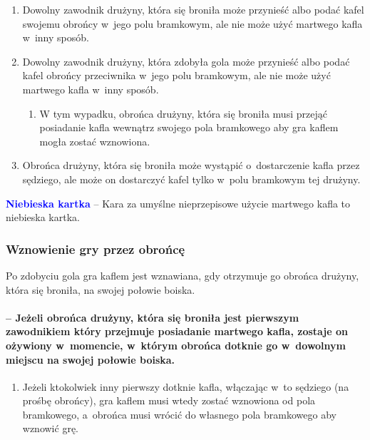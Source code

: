\documentclass[12pt,a4paper]{article}
\newcommand\bluecard[1]{\bgroup\textcolor{blue}{\textbf{#1}}}
\begin{document}
\begin{enumerate}
	\item
	      Dowolny zawodnik drużyny, która się broniła może przynieść albo podać
	      kafel swojemu obrońcy w~jego polu bramkowym, ale nie może użyć
	      martwego kafla w~inny sposób.
	\item
	      Dowolny zawodnik drużyny, która zdobyła gola może przynieść albo podać
	      kafel obrońcy przeciwnika w~jego polu bramkowym, ale nie może użyć
	      martwego kafla w~inny sposób.

	      \begin{enumerate}
		      \item
		            W tym wypadku, obrońca drużyny, która się broniła musi przejąć
		            posiadanie kafla wewnątrz swojego pola bramkowego aby gra kaflem
		            mogła zostać wznowiona.
	      \end{enumerate}
	\item
	      Obrońca drużyny, która się broniła może wystąpić o~dostarczenie kafla
	      przez sędziego, ale może on dostarczyć kafel tylko w~polu bramkowym
	      tej drużyny.
\end{enumerate}

\bluecard{Niebieska kartka} -- Kara za umyślne nieprzepisowe użycie martwego
kafla to niebieska kartka.

\subsubsection{Wznowienie gry przez obrońcę}
Po zdobyciu gola gra
kaflem jest wznawiana, gdy otrzymuje go obrońca drużyny, która się
broniła, na swojej połowie boiska.

\paragraph{ -- Jeżeli obrońca drużyny, która się broniła jest
	pierwszym zawodnikiem który przejmuje posiadanie martwego kafla, zostaje
	on ożywiony w~momencie, w~którym obrońca dotknie go w~dowolnym miejscu
	na swojej połowie boiska.}

\begin{enumerate}
	\item
	      Jeżeli ktokolwiek inny pierwszy dotknie kafla, włączając w~to sędziego
	      (na prośbę obrońcy), gra kaflem musi wtedy zostać wznowiona od pola
	      bramkowego, a~obrońca musi wrócić do własnego pola bramkowego aby
	      wznowić grę.
\end{enumerate}
\end{document}
